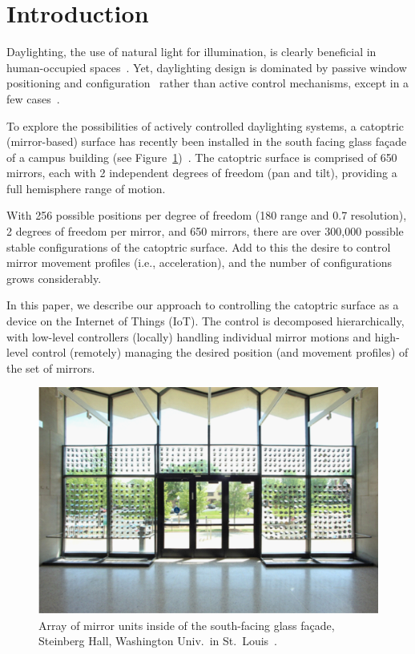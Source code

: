 \section{Introduction}
\label{sec:intro}

Daylighting, the use of natural light for illumination, is clearly
beneficial in human-occupied
spaces~\cite{hhm15,Leslie03}.
Yet, daylighting design is dominated by passive window positioning
and configuration~\cite{Leslie03} rather than active control mechanisms,
except in a few cases~\cite{kt16}.

To explore the possibilities of actively controlled daylighting systems,
a catoptric (mirror-based) surface has recently been installed in
the south facing glass fa\c cade of a campus building
(see Figure~\ref{fig:steinberg})~\cite{acadia18}.
The catoptric surface is comprised of 650 mirrors, each with 2 independent
degrees of freedom (pan and tilt), providing a full hemisphere
range of motion.

With 256 possible positions per degree of freedom (180\degree{} range
and 0.7\degree{} resolution), 2 degrees of freedom per mirror, and 650 mirrors, 
there are over 300,000 possible stable configurations of the catoptric surface.
Add to this the desire to control mirror movement profiles (i.e.,
acceleration), and the number of configurations grows considerably.

In this paper, we describe our approach to controlling the catoptric surface
as a device on the Internet of Things (IoT).
The control is decomposed hierarchically, with low-level controllers
(locally)
handling individual mirror motions and high-level control (remotely)
managing the
desired position (and movement profiles) of the set of mirrors.

\begin{figure}[ht]
\includegraphics[width=0.88\columnwidth]{steinberg}
\caption{Array of mirror units inside of the south-facing glass fa\c cade, Steinberg Hall, Washington Univ.~in St.~Louis~\protect\cite{acadia18}.}
\label{fig:steinberg}
\end{figure}


